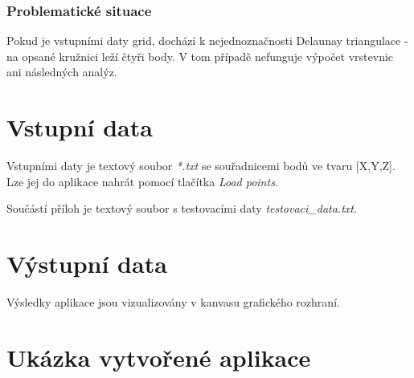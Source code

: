 \documentclass[a4paper, 12pt]{article}
\begin{document}
\subsubsection{Problematické situace}
Pokud je vstupními daty grid, dochází k nejednoznačnosti Delaunay triangulace - na opsané kružnici leží čtyři body. V tom případě nefunguje výpočet vrstevnic ani následných analýz.



\clearpage


\section{Vstupní data}

Vstupními daty je textový soubor \textit{*.txt} se souřadnicemi bodů ve tvaru [X,Y,Z]. Lze jej do aplikace nahrát pomocí tlačítka \textit{Load points}.

Součástí příloh je textový soubor s testovacími daty \textit{testovaci\_data.txt}.

\section{Výstupní data}
Výsledky aplikace jsou vizualizovány v kanvasu grafického rozhraní.


\clearpage

\section{Ukázka vytvořené aplikace}
\end{document}
